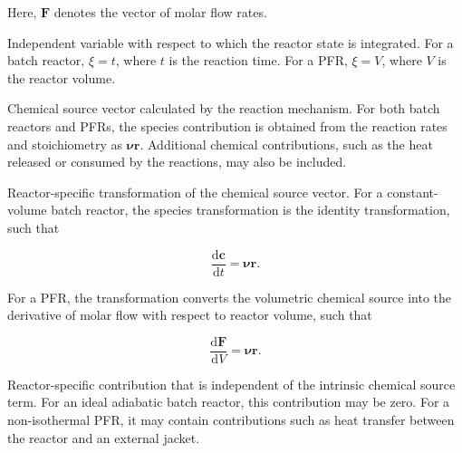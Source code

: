 \begin{description}
    Here, $\mathbf{F}$ denotes the vector of molar flow rates.

    \item[$\xi$] Independent variable with respect to which the reactor state
    is integrated.
    For a batch reactor, $\xi = t$, where $t$ is the reaction time.
    For a PFR, $\xi = V$, where $V$ is the reactor volume.

    \item[$\mathbf{s}_{\mathrm{chemical}}$] Chemical source vector calculated
    by the reaction mechanism.
    For both batch reactors and PFRs, the species contribution is obtained
    from the reaction rates and stoichiometry as
    $\boldsymbol{\nu}\mathbf{r}$.
    Additional chemical contributions, such as the heat released or consumed
    by the reactions, may also be included.

    \item[$\mathcal{T}_{\mathrm{reactor}}$] Reactor-specific transformation
    of the chemical source vector.
    For a constant-volume batch reactor, the species transformation is the
    identity transformation, such that

    \begin{equation}
        \frac{\mathrm{d}\mathbf{c}}{\mathrm{d}t}
        =
        \boldsymbol{\nu}\mathbf{r}.
    \end{equation}

    For a PFR, the transformation converts the volumetric chemical source
    into the derivative of molar flow with respect to reactor volume, such that

    \begin{equation}
        \frac{\mathrm{d}\mathbf{F}}{\mathrm{d}V}
        =
        \boldsymbol{\nu}\mathbf{r}.
    \end{equation}

    \item[$\mathbf{s}_{\mathrm{reactor}}$] Reactor-specific contribution that
    is independent of the intrinsic chemical source term.
    For an ideal adiabatic batch reactor, this contribution may be zero.
    For a non-isothermal PFR, it may contain contributions such as heat
    transfer between the reactor and an external jacket.

\end{description}
